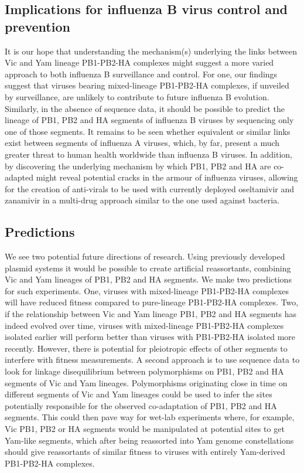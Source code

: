 \documentclass[11pt,oneside,letterpaper]{article}
\begin{document}
\subsection*{Implications for influenza B virus control and prevention}
It is our hope that understanding the mechanism(s) underlying the links between Vic and Yam lineage PB1-PB2-HA complexes might suggest a more varied approach to both influenza B surveillance and control.
For one, our findings suggest that viruses bearing mixed-lineage PB1-PB2-HA complexes, if unveiled by surveillance, are unlikely to contribute to future influenza B evolution.
Similarly, in the absence of sequence data, it should be possible to predict the lineage of PB1, PB2 and HA segments of influenza B viruses by sequencing only one of those segments.
It remains to be seen whether equivalent or similar links exist between segments of influenza A viruses, which, by far, present a much greater threat to human health worldwide than influenza B viruses.
In addition, by discovering the underlying mechanism by which PB1, PB2 and HA are co-adapted might reveal potential cracks in the armour of influenza viruses, allowing for the creation of anti-virals to be used with currently deployed oseltamivir and zanamivir in a multi-drug approach similar to the one used against bacteria.

\subsection*{Predictions}
We see two potential future directions of research.
Using previously developed plasmid systems it would be possible to create artificial reassortants, combining Vic and Yam lineages of PB1, PB2 and HA segments.
We make two predictions for such experiments.
One, viruses with mixed-lineage PB1-PB2-HA complexes will have reduced fitness compared to pure-lineage PB1-PB2-HA complexes.
Two, if the relationship between Vic and Yam lineage PB1, PB2 and HA segments has indeed evolved over time, viruses with mixed-lineage PB1-PB2-HA complexes isolated earlier will perform better than viruses with PB1-PB2-HA isolated more recently.
However, there is potential for pleiotropic effects of other segments to interfere with fitness measurements.
A second approach is to use sequence data to look for linkage disequilibrium between polymorphisms on PB1, PB2 and HA segments of Vic and Yam lineages.
Polymorphisms originating close in time on different segments of Vic and Yam lineages could be used to infer the sites potentially responsible for the observed co-adaptation of PB1, PB2 and HA segments.
This could then pave way for wet-lab experiments where, for example, Vic PB1, PB2 or HA segments would be manipulated at potential sites to get Yam-like segments, which after being reassorted into Yam genome constellations should give reassortants of similar fitness to viruses with entirely Yam-derived PB1-PB2-HA complexes. 
\end{document}
